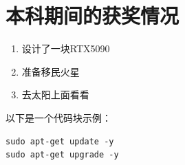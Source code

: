 \documentclass[bachelor]{njupthesis}
\begin{document}
\section{本科期间的获奖情况}
\begin{enumerate} %
	\item 设计了一块RTX5090
	\item 准备移民火星
	\item 去太阳上面看看
\end{enumerate}

以下是一个代码块示例：

\lstset{language=bash} %
\begin{lstlisting}[caption={更新Ubuntu软件}, label={code:apt-update}]
sudo apt-get update -y
sudo apt-get upgrade -y
\end{lstlisting}
\end{document}
